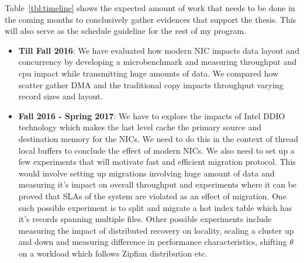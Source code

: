 Table~\ref{tbl:timeline} shows the expected amount of work that needs to be done 
in the coming months to conclusively gather evidences that support the thesis. 
This will also serve as the schedule guideline for the rest of my program.


\begin{itemize}
\item{\textbf{Till Fall 2016}:} We have evaluated how modern NIC impacts data layout 
and concurrency by developing a microbenchmark and measuring throughput and cpu 
impact while transmitting huge amounts of data. We compared how scatter gather DMA 
and the traditional copy impacts throughput varying record sizes and layout. 

\item{\textbf{Fall 2016 - Spring 2017}:} We have to explore the impacts of Intel\textregistered 
DDIO~\cite{ddio} technology which makes the last level cache the primary source and 
destination memory for the NICs. We need to do this in the context of thread local 
buffers to conclude the effect of modern NICs. We also need to set up a few experiments
that will motivate fast and efficient migration protocol. This would involve 
setting up migrations involving huge amount of data and measuring it's impact on overall throughput
and experiments where it can be proved that SLAs of the system are violated as an effect of migration.
One such possible experiment is to split and migrate a hot index table which has it's 
records spanning multiple files. Other possible experiments include measuring the 
impact of distributed recovery on locality, scaling a cluster up and down and measuring
difference in performance characteristics, shifting $\theta$ on a workload which follows 
Zipfian distribution etc.
\end{itemize}



%